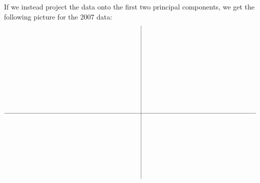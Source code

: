 \documentclass{ximera}
\begin{document}
If we instead project the data onto the first two principal
components, we get the following picture for the 2007 data:
\begin{equation*}
  \def\dataD#1#2#3#4#5#6#7{\fill[dem](#5,#6) circle (0.09);}
  \def\dataR#1#2#3#4#5#6#7{\fill[rep](#5,#6) circle (0.09);}
  \def\dataDx#1#2#3#4#5#6#7{\fill[dem](#5,#6) circle (0.09);
    \draw[dem,->,shorten >=0.15cm](#5,#6) +(#7,1) node[above] {\rotatebox{90}{\footnotesize #1, #4}} -- +(0,0);}
  \def\dataRx#1#2#3#4#5#6#7{\fill[rep](#5,#6) circle (0.09);
    \draw[rep,->,shorten >=0.15cm](#5,#6) +(#7,1) node[above] {\rotatebox{90}{\footnotesize #1, #4}} -- +(0,0);}
  \def\dataDy#1#2#3#4#5#6#7{\fill[dem](#5,#6) circle (0.09);
    \draw[dem,->,shorten >=0.15cm](#5,#6) +(#7,-1) node[below] {\rotatebox{90}{\footnotesize #1, #4}} -- +(0,0);}
  \def\dataRy#1#2#3#4#5#6#7{\fill[rep](#5,#6) circle (0.09);
    \draw[rep,->,shorten >=0.15cm](#5,#6) +(#7,-1) node[below] {\rotatebox{90}{\footnotesize #1, #4}} -- +(0,0);}
  \begin{tikzpicture}[scale=0.71]
    \draw (-12.5,0) -- (10.5,0);
    \draw (0,-6) -- (0,8);

    \tikzset{
      dem/.style={draw=blue, fill=blue}, %
      rep/.style={draw=red, fill=red}    %
    }


\end{tikzpicture}
\end{equation*}
\end{document}
